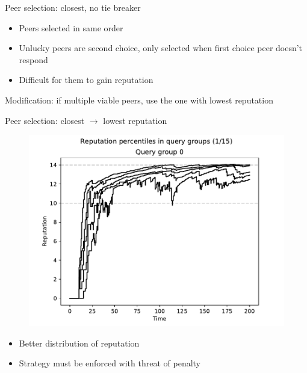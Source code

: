 \documentclass[presentation,english,usenames,dvipsnames]{beamer}
\begin{document}
\begin{frame}{Peer selection: closest, no tie breaker}
  \begin{itemize}
    \item Peers selected in same order
    \item Unlucky peers are second choice, only selected when first choice peer
          doesn't respond
    \item Difficult for them to gain reputation
  \end{itemize}

  \pause

  \begin{block}{}
    Modification: if multiple viable peers, use the one with lowest reputation
  \end{block}
\end{frame}

\begin{frame}{Peer selection: closest $\rightarrow$ lowest reputation}
  \begin{minipage}{0.5\textwidth}
    \begin{figure}
      \centering
      \includegraphics[width=1\textwidth]{figures/selection_overlap_rep_sorted_rep_percs_1_of_15}
    \end{figure}
  \end{minipage}%
  \begin{minipage}{0.5\textwidth}
    \begin{itemize}
      \item Better distribution of reputation
      \item Strategy must be enforced with threat of penalty
    \end{itemize}
  \end{minipage}
\end{frame}
\end{document}
